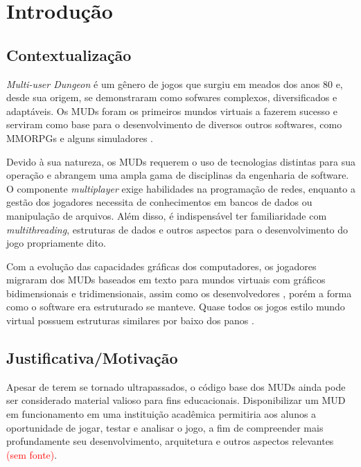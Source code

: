 \chapter*[Introdução]{Introdução}

\section{Contextualização}

\textit{Multi-user Dungeon} é um gênero de jogos que surgiu em meados dos anos 80 e, desde sua origem, 
se demonstraram como sofwares complexos, diversificados e adaptáveis. Os MUDs foram os primeiros mundos 
virtuais a fazerem sucesso e serviram como base para o desenvolvimento de diversos outros softwares, 
como MMORPGs e alguns simuladores \cite{bartle2004designing,penton2003mud}.

Devido à sua natureza, os MUDs requerem o uso de tecnologias distintas para sua operação e abrangem uma 
ampla gama de disciplinas da engenharia de software. O componente \textit{multiplayer} exige habilidades 
na programação de redes, enquanto a gestão dos jogadores necessita de conhecimentos em bancos de dados ou 
manipulação de arquivos. Além disso, é indispensável ter familiaridade com \textit{multithreading}, 
estruturas de dados e outros aspectos para o desenvolvimento do jogo propriamente dito.

Com a evolução das capacidades gráficas dos computadores, os jogadores migraram dos MUDs baseados em texto 
para mundos virtuais com gráficos bidimensionais e tridimensionais, assim como os desenvolvedores \cite{bartle2004designing}, 
porém a forma como o software era estruturado se manteve. Quase todos os jogos estilo mundo virtual 
possuem estruturas similares por baixo dos panos \cite{penton2003mud}.

\section{Justificativa/Motivação}

Apesar de terem se tornado ultrapassados, o código base dos MUDs ainda pode ser considerado material valioso 
para fins educacionais. Disponibilizar um MUD em funcionamento em uma instituição acadêmica permitiria aos 
alunos a oportunidade de jogar, testar e analisar o jogo, a fim de compreender mais profundamente seu 
desenvolvimento, arquitetura e outros aspectos relevantes \textcolor{red}{(sem fonte)}.

